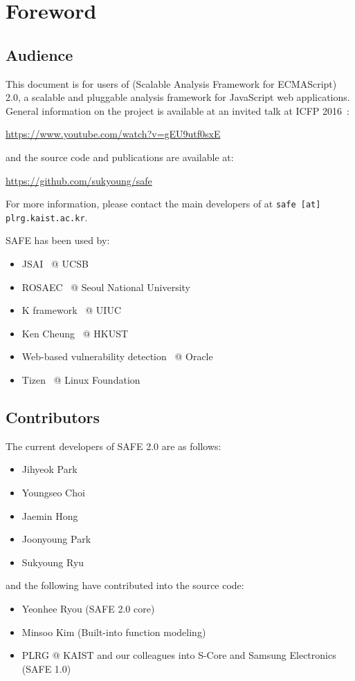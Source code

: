 \chapter{Foreword}
\label{c:1:foreword}

\section{Audience}
This document is for users of \safe (Scalable Analysis Framework for ECMAScript)
2.0, a scalable and pluggable analysis framework for JavaScript web applications.
General information on the \safe project is available at an invited talk at ICFP 2016~\cite{safeicfp16}:
\begin{center}
  \url{https://www.youtube.com/watch?v=gEU9utf0sxE}
\end{center}
and the source code and publications are available at:
\begin{center}
  \url{https://github.com/sukyoung/safe}
\end{center}
For more information, please contact the main developers of \safe
at \texttt{safe [at] plrg.kaist.ac.kr}.

SAFE has been used by:
\begin{itemize}
\itemsep-.1em
\item JSAI~\cite{jsai} @ UCSB
\item ROSAEC~\cite{rosaec} @ Seoul National University
\item K framework~\cite{kjs} @ UIUC
\item Ken Cheung~\cite{emse16} @ HKUST
\item Web-based vulnerability detection~\cite{oracle} @ Oracle
\item Tizen~\cite{tizen} @ Linux Foundation
\end{itemize}

\section{Contributors}
The current developers of SAFE 2.0 are as follows:
\begin{itemize}
\itemsep-.1em
\item Jihyeok Park
\item Youngseo Choi
\item Jaemin Hong
\item Joonyoung Park
\item Sukyoung Ryu
\end{itemize}
and the following have contributed into the source code:
\begin{itemize}
\itemsep-.1em
\item Yeonhee Ryou (SAFE 2.0 core)
\item Minsoo Kim (Built-into function modeling)
\item PLRG @ KAIST and our colleagues into S-Core and Samsung Electronics (SAFE 1.0)
\end{itemize}


